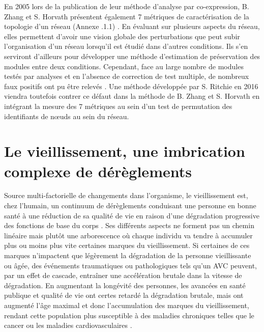 

En 2005 lors de la publication de leur méthode d'analyse par co-expression, B. Zhang et S. Horvath présentent également 7 métriques de caractérisation de la topologie d'un réseau (Annexe .1.1) \cite{Zhang2005a}. En évaluant sur plusieurs aspects du réseau, elles permettent d'avoir une vision globale des perturbations que peut subir l'organisation d'un réseau lorsqu'il est étudié dans d'autres conditions. Ils s'en serviront d'ailleurs pour développer une méthode d'estimation de préservation des modules entre deux conditions. Cependant, face au large nombre de modules testés par analyses et en l'absence de correction de test multiple, de nombreux faux positifs ont pu être relevés \cite{Ritchie2016}. Une méthode développée par S. Ritchie en 2016 viendra toutefois contrer ce défaut dans la méthode de B. Zhang et S. Horvath en intégrant la mesure des 7 métriques au sein d'un test de permutation des identifiants de nœuds au sein du réseau. 




\section{Le vieillissement, une imbrication complexe de dérèglements}


Source multi-factorielle de changements dans l'organisme, le vieillissement est, chez l'humain, un continuum de dérèglements conduisant une personne en bonne santé à une réduction de sa qualité de vie en raison d'une dégradation progressive des fonctions de base du corps \cite{Berrut2013}. Ses différents aspects ne forment pas un chemin linéaire mais plutôt une arborescence où chaque individu va tendre à accumuler plus ou moins plus vite certaines marques du vieillissement. Si certaines de ces marques n'impactent que légèrement la dégradation de la personne vieillissante ou âgée, des événements traumatiques ou pathologiques tels qu'un AVC peuvent, par un effet de cascade, entraîner une accélération brutale dans la vitesse de dégradation. En augmentant la longévité des personnes, les avancées en santé publique et qualité de vie ont certes retardé la dégradation brutale, mais ont augmenté l'âge maximal et donc l'accumulation des marques du vieillissement, rendant cette population plus susceptible à des maladies chroniques telles que le cancer ou les maladies cardiovasculaires \cite{Khan2017Aug}. 

